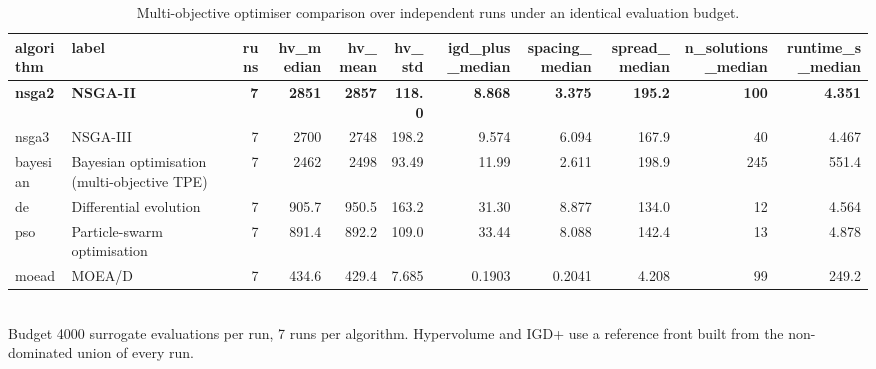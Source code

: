 \begin{table}[!t]
\centering
\caption{Multi-objective optimiser comparison over independent runs under an identical evaluation budget.}
\label{tab:optimization_algorithm_summary_main}
\footnotesize
\begin{tabular}{llrrrrrrrrr}
\toprule
algorithm & label & runs & hv\_median & hv\_mean & hv\_std & igd\_plus\_median & spacing\_median & spread\_median & n\_solutions\_median & runtime\_s\_median \\
\midrule
\textbf{nsga2} & \textbf{NSGA-II} & \textbf{7} & \textbf{2851} & \textbf{2857} & \textbf{118.0} & \textbf{8.868} & \textbf{3.375} & \textbf{195.2} & \textbf{100} & \textbf{4.351} \\
nsga3 & NSGA-III & 7 & 2700 & 2748 & 198.2 & 9.574 & 6.094 & 167.9 & 40 & 4.467 \\
bayesian & Bayesian optimisation (multi-objective TPE) & 7 & 2462 & 2498 & 93.49 & 11.99 & 2.611 & 198.9 & 245 & 551.4 \\
de & Differential evolution & 7 & 905.7 & 950.5 & 163.2 & 31.30 & 8.877 & 134.0 & 12 & 4.564 \\
pso & Particle-swarm optimisation & 7 & 891.4 & 892.2 & 109.0 & 33.44 & 8.088 & 142.4 & 13 & 4.878 \\
moead & MOEA/D & 7 & 434.6 & 429.4 & 7.685 & 0.1903 & 0.2041 & 4.208 & 99 & 249.2 \\
\bottomrule
\end{tabular}
\\[2pt] \footnotesize Budget 4000 surrogate evaluations per run, 7 runs per algorithm. Hypervolume and IGD+ use a reference front built from the non-dominated union of every run.
\end{table}
